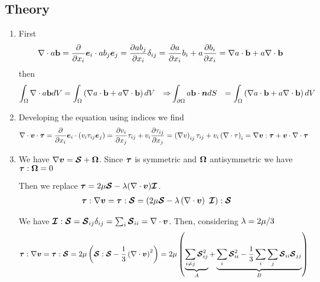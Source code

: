 
\subsection*{Theory}

\begin{enumerate}
\item First 
  \begin{align*}
    \nabla \cdot a \mathbf b 
    = \frac{\partial }{\partial x_i} \boldsymbol e_{i} \cdot a b_j \boldsymbol e_{j} = \frac{\partial ab_j}{\partial x_i} \delta_{ij} 
    = \frac{\partial a}{\partial x_i} b_i + a \frac{\partial b_i}{\partial x_i} 
    = \nabla a \cdot \mathbf b + a \nabla \cdot \mathbf b
  \end{align*}
  then 
  \begin{align*}
    \int_{\Omega} \nabla \cdot a \mathbf b dV &= \int_{\Omega} \left(\nabla a \cdot
      \mathbf b + a \nabla \cdot \mathbf b\right) dV &\Rightarrow& \int_{{\partial \Omega}}
    a \mathbf b \cdot \boldsymbol {n} dS &= \int_{\Omega} \left(\nabla a \cdot
      \mathbf b + a \nabla \cdot \mathbf b\right) dV
  \end{align*}
\item Developing the equation using indices we find
  \begin{align*}
    \nabla \cdot \boldsymbol {v} \cdot \boldsymbol {\tau}  
    &= \frac{\partial }{\partial x_i} \boldsymbol e_{i} \cdot \left(v_i \tau_{ij} \boldsymbol e_{j}\right) 
    = \frac{\partial v_i}{\partial x_j} \tau_{ij} + 
    v_i \frac{\partial \tau_{ij}}{\partial x_j} = \left(\nabla v\right)_{ij} \tau_{ij} + 
    v_i \left(\nabla \cdot \tau \right)_i = \nabla \boldsymbol {v} : \boldsymbol {\tau} + 
    \boldsymbol {v} \cdot \nabla \cdot \boldsymbol {\tau}    
  \end{align*}
\item We have $\nabla \boldsymbol {v} = \boldsymbol {\boldsymbol {\mathcal S}} + \boldsymbol {\Omega}$. Since
  $\boldsymbol {\tau}$ is symmetric and $\boldsymbol {\Omega}$ antisymmetric we have
  $\boldsymbol {\tau}:\boldsymbol {\Omega} = 0$

  
  Then we replace $\boldsymbol {\tau} = 2 \mu \boldsymbol {\boldsymbol {\mathcal S}} - \lambda
  (\nabla \cdot \boldsymbol {v}) \boldsymbol {\mathcal I}$.
  \begin{align*}
    \boldsymbol {\tau} : \nabla \boldsymbol {v} &= \boldsymbol {\tau} : \boldsymbol {\boldsymbol {\mathcal S}} =
    \left(2 \mu \boldsymbol {\boldsymbol {\mathcal S}} - \lambda \left(\nabla \cdot \boldsymbol {v}\right)~
      \boldsymbol {\mathcal I}\right) : \boldsymbol {\boldsymbol {\mathcal S}} 
  \end{align*}
  
  We have $\boldsymbol {\mathcal I} : \boldsymbol {\boldsymbol {\mathcal S}} = \boldsymbol {\mathcal S}_{ij} \delta_{ij} =
  \sum_i \boldsymbol {\mathcal S}_{ii} = \nabla \cdot \boldsymbol {v}$. Then, considering $\lambda
  = 2 \mu / 3$
  \begin{align*}
    \boldsymbol {\tau} : \nabla \boldsymbol {v} 
    &= \boldsymbol {\tau} : \boldsymbol {\boldsymbol {\mathcal S}} 
    = 2 \mu \left(
      \boldsymbol {\boldsymbol {\mathcal S}}:\boldsymbol {\boldsymbol {\mathcal S}} - 
      \frac{1}{3} \left(\nabla \cdot \boldsymbol {v}\right)^2 \right)
    = 2 \mu \left(
      \underbrace{\sum_{i\neq j} \boldsymbol {\mathcal S}_{ij}^2}_{A} + 
      \underbrace{
        \sum_i \boldsymbol {\mathcal S}_{ii}^2 - 
        \frac{1}{3} \sum_i \sum_j \boldsymbol {\mathcal S}_{ii} \boldsymbol {\mathcal S}_{jj}}_{B}\right) 
  \end{align*}
  

\end{enumerate}
